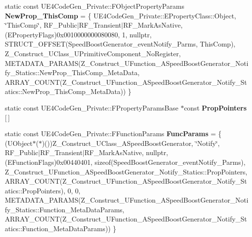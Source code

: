 \begin{DoxyCompactItemize}
\item 
\mbox{\label{struct_z___construct___u_function___a_speed_boost_generator___notify___statics_a25150456515b73c4db27f0815e38f984}} 
static const U\+E4\+Code\+Gen\+\_\+\+Private\+::\+F\+Object\+Property\+Params {\bfseries New\+Prop\+\_\+\+This\+Comp} = \{ U\+E4\+Code\+Gen\+\_\+\+Private\+::\+E\+Property\+Class\+::\+Object, \char`\"{}This\+Comp\char`\"{}, R\+F\+\_\+\+Public$\vert$R\+F\+\_\+\+Transient$\vert$R\+F\+\_\+\+Mark\+As\+Native, (E\+Property\+Flags)0x0010000000080080, 1, nullptr, S\+T\+R\+U\+C\+T\+\_\+\+O\+F\+F\+S\+E\+T(\+Speed\+Boost\+Generator\+\_\+event\+Notify\+\_\+\+Parms, This\+Comp), Z\+\_\+\+Construct\+\_\+\+U\+Class\+\_\+\+U\+Primitive\+Component\+\_\+\+No\+Register, M\+E\+T\+A\+D\+A\+T\+A\+\_\+\+P\+A\+R\+A\+M\+S(\+Z\+\_\+\+Construct\+\_\+\+U\+Function\+\_\+\+A\+Speed\+Boost\+Generator\+\_\+\+Notify\+\_\+\+Statics\+::\+New\+Prop\+\_\+\+This\+Comp\+\_\+\+Meta\+Data, A\+R\+R\+A\+Y\+\_\+\+C\+O\+U\+N\+T(\+Z\+\_\+\+Construct\+\_\+\+U\+Function\+\_\+\+A\+Speed\+Boost\+Generator\+\_\+\+Notify\+\_\+\+Statics\+::\+New\+Prop\+\_\+\+This\+Comp\+\_\+\+Meta\+Data)) \}
\item 
static const U\+E4\+Code\+Gen\+\_\+\+Private\+::\+F\+Property\+Params\+Base $\ast$const {\bfseries Prop\+Pointers} \mbox{[}$\,$\mbox{]}
\item 
\mbox{\label{struct_z___construct___u_function___a_speed_boost_generator___notify___statics_a6466c052f6dd8b22df939078a4b48b7c}} 
static const U\+E4\+Code\+Gen\+\_\+\+Private\+::\+F\+Function\+Params {\bfseries Func\+Params} = \{ (U\+Object$\ast$($\ast$)())Z\+\_\+\+Construct\+\_\+\+U\+Class\+\_\+\+A\+Speed\+Boost\+Generator, \char`\"{}Notify\char`\"{}, R\+F\+\_\+\+Public$\vert$R\+F\+\_\+\+Transient$\vert$R\+F\+\_\+\+Mark\+As\+Native, nullptr, (E\+Function\+Flags)0x00440401, sizeof(\+Speed\+Boost\+Generator\+\_\+event\+Notify\+\_\+\+Parms), Z\+\_\+\+Construct\+\_\+\+U\+Function\+\_\+\+A\+Speed\+Boost\+Generator\+\_\+\+Notify\+\_\+\+Statics\+::\+Prop\+Pointers, A\+R\+R\+A\+Y\+\_\+\+C\+O\+U\+N\+T(\+Z\+\_\+\+Construct\+\_\+\+U\+Function\+\_\+\+A\+Speed\+Boost\+Generator\+\_\+\+Notify\+\_\+\+Statics\+::\+Prop\+Pointers), 0, 0, M\+E\+T\+A\+D\+A\+T\+A\+\_\+\+P\+A\+R\+A\+M\+S(\+Z\+\_\+\+Construct\+\_\+\+U\+Function\+\_\+\+A\+Speed\+Boost\+Generator\+\_\+\+Notify\+\_\+\+Statics\+::\+Function\+\_\+\+Meta\+Data\+Params, A\+R\+R\+A\+Y\+\_\+\+C\+O\+U\+N\+T(\+Z\+\_\+\+Construct\+\_\+\+U\+Function\+\_\+\+A\+Speed\+Boost\+Generator\+\_\+\+Notify\+\_\+\+Statics\+::\+Function\+\_\+\+Meta\+Data\+Params)) \}
\end{DoxyCompactItemize}


